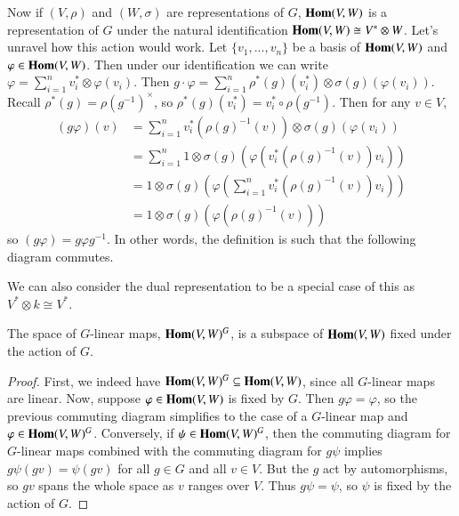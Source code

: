 Now if $(V,\rho)$ and $(W,\sigma)$ are representations of $G$, $\mathbf{Hom}(V,W)$ is a representation of $G$ under the natural identification $\mathbf{Hom}(V,W)\cong V^*\otimes W$. Let's unravel how this action would work. Let $\{v_1,...,v_n\}$ be a basis of $\mathbf{Hom}(V,W)$ and $\varphi \in \mathbf{Hom}(V,W)$. Then under our identification we can write $\varphi = \sum_{i=1}^nv_i^*\otimes \varphi(v_i)$. Then $g\cdot \varphi = \sum_{i=1}^n\rho^*(g)(v_i^*)\otimes \sigma(g)(\varphi(v_i))$. Recall $\rho^*(g) = \rho(g^{-1})^{\times}$, so $\rho^*(g)(v_i^*) = v_i^*\circ\rho(g^{-1})$. Then for any $v \in V$, \begin{align*}
    (g\varphi)(v) &=\sum_{i=1}^nv_i^*(\rho(g)^{-1}(v))\otimes \sigma(g)(\varphi(v_i)) \\
    &= \sum_{i=1}^n1\otimes \sigma(g)(\varphi(v_i^*(\rho(g)^{-1}(v))v_i)) \\
    &= 1\otimes \sigma(g)\left(\varphi\left(\sum_{i=1}^nv_i^*(\rho(g)^{-1}(v))v_i\right)\right) \\
    &= 1\otimes \sigma(g)\left(\varphi\left(\rho(g)^{-1}(v)\right)\right)
\end{align*}
so $(g\varphi) = g\varphi g^{-1}$. In other words, the definition is such that the following diagram commutes.
\begin{center}
\end{center}
We can also consider the dual representation to be a special case of this as $V^*\otimes k \cong V^*$.

\begin{proposition}
    The space of $G$-linear maps, $\mathbf{Hom}(V,W)^G$, is a subspace of $\mathbf{Hom}(V,W)$ fixed under the action of $G$.
\end{proposition}
\begin{proof}
    First, we indeed have $\mathbf{Hom}(V,W)^G \subseteq \mathbf{Hom}(V,W)$, since all $G$-linear maps are linear. Now, suppose $\varphi \in \mathbf{Hom}(V,W)$ is fixed by $G$. Then $g\varphi = \varphi$, so the previous commuting diagram simplifies to the case of a $G$-linear map and $\varphi \in \mathbf{Hom}(V,W)^G$. Conversely, if $\psi \in \mathbf{Hom}(V,W)^G$, then the commuting diagram for $G$-linear maps combined with the commuting diagram for $g\psi$ implies $g\psi(gv) = \psi(gv)$ for all $g \in G$ and all $v \in V$. But the $g$ act by automorphisms, so $gv$ spans the whole space as $v$ ranges over $V$. Thus $g\psi = \psi$, so $\psi$ is fixed by the action of $G$.
\end{proof}

